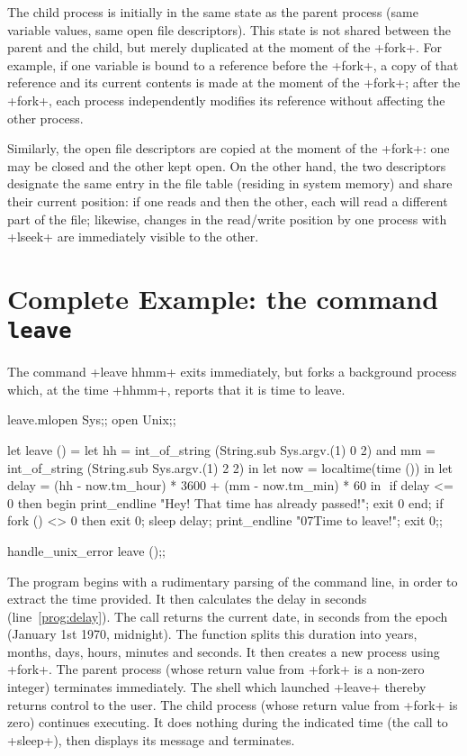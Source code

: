 The child process is initially in the same state as the parent process
(same variable values, same open file descriptors).  This state is not
shared between the parent and the child, but merely duplicated at the
moment of the \ml+fork+.  For example, if one variable is bound to a
reference before the \ml+fork+, a copy of that reference and its
current contents is made at the moment of the \ml+fork+; after the
\ml+fork+, each process independently modifies its 
reference without affecting the other process.

Similarly, the open file descriptors are copied at the moment of the
\ml+fork+: one may be closed and the other kept open.  On the other
hand, the two descriptors designate the same entry in the file table
(residing in system memory) and share their current position: if one
reads and then the other, each will read a different part of the file;
likewise, changes in the read/write position by one process with \ml+lseek+ are
immediately visible to the other. 


\section{Complete Example: the command {\normalfont\texttt{leave}}}

The command \ml+leave hhmm+ exits immediately, but
forks a background process which, at the time \ml+hhmm+, reports that
it is time to leave.
%
\begin{listingcodefile}[style=numbers]{leave.ml}open Sys;;
open Unix;;

let leave () =
 let hh = int_of_string (String.sub Sys.argv.(1) 0 2)
 and mm = int_of_string (String.sub Sys.argv.(1) 2 2) in
 let now = localtime(time ()) in
 let delay = (hh - now.tm_hour) * 3600 + (mm - now.tm_min) * 60 in
$\label{prog:delay}$
 if delay <= 0 then begin
   print_endline "Hey! That time has already passed!";
   exit 0
 end;
 if fork () <> 0 then exit 0;
 sleep delay;
 print_endline "\007Time to leave!";
 exit 0;;

handle_unix_error leave ();;
\end{listingcodefile}
% 
The program begins with a rudimentary parsing of the command line,
in order to extract the time provided.  It then calculates the delay
in seconds (line~\ref{prog:delay}). The 
call returns the current date, in seconds from the epoch (January 1st
1970, midnight).  The function  splits
this duration into years, months, days, hours, minutes and seconds.
It then creates a new process using \ml+fork+.  The parent process
(whose return value from \ml+fork+ is a non-zero integer) terminates
immediately.  The shell which launched \ml+leave+ thereby returns
control to the user.  The child process (whose return value from
\ml+fork+ is zero) continues executing.  It does nothing during the
indicated time (the call to \ml+sleep+), then displays its message and
terminates.

